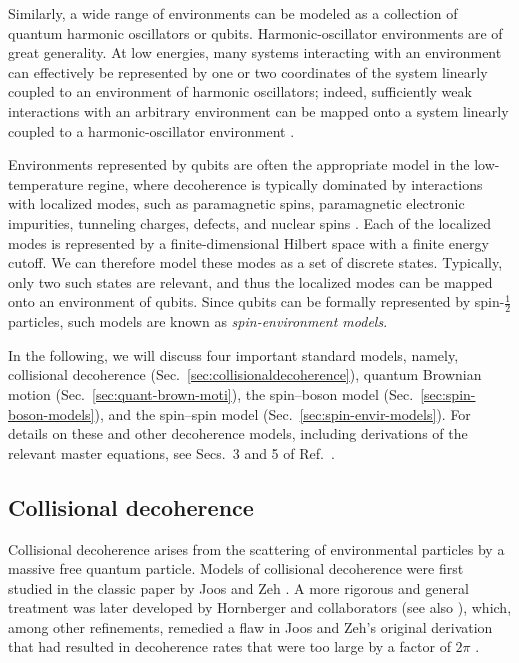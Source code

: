 \documentclass[aps,pra,reprint,amsmath,amssymb,showpacs,nofootinbib,floatfix,onecolumn,12pt]{revtex4-1}
\begin{document}
Similarly, a wide range of environments can be modeled as a collection of quantum harmonic oscillators or qubits. Harmonic-oscillator environments are of great generality. At low energies, many systems interacting with an environment can effectively be represented by one or two coordinates of the system linearly coupled to an environment of harmonic oscillators; indeed, sufficiently weak interactions with an arbitrary environment can be mapped onto a system linearly coupled to a harmonic-oscillator environment \cite{Feynman:1963:jj,Caldeira:1983:gv}.

Environments represented by qubits are often the appropriate model in the low-temperature regine, where decoherence is typically dominated by interactions with localized modes, such as paramagnetic spins, paramagnetic electronic impurities, tunneling charges, defects, and nuclear spins \cite{Dube:2001:zz,Prokofev:2000:zz,Lounasmaa:1974:yb}. Each of the localized modes is represented by a finite-dimensional Hilbert space with a finite energy cutoff. We can therefore model these modes as a set of discrete states. Typically, only two such states are relevant, and thus the localized modes can be mapped onto an environment of qubits. Since qubits can be formally represented by spin-$\frac{1}{2}$ particles, such models are known as \emph{spin-environment models}. 

In the following, we will discuss four important standard models, namely, collisional decoherence (Sec.~\ref{sec:collisionaldecoherence}), quantum Brownian motion (Sec.~\ref{sec:quant-brown-moti}), the spin--boson model (Sec.~\ref{sec:spin-boson-models}), and the spin--spin model (Sec.~\ref{sec:spin-envir-models}). For details on these and other decoherence models, including derivations of the relevant master equations, see Secs.~3 and 5 of Ref.~\cite{Schlosshauer:2007:un}. 

\subsection{\label{sec:collisionaldecoherence}Collisional decoherence}

Collisional decoherence arises from the scattering of environmental particles by a massive free quantum particle. Models of collisional decoherence were first studied in the classic paper by Joos and Zeh \cite{Joos:1985:iu}. A more rigorous and general treatment was later developed by Hornberger and collaborators \cite{Hornberger:2003:un,Hornberger:2006:tb,Hornberger:2008:ii,Busse:2009:aa,Busse:2010:aa} (see also \cite{Gallis:1990:un,Diosi:1995:um,Adler:2006:yb}), which, among other refinements, remedied a flaw in Joos and Zeh's original derivation that had resulted in decoherence rates that were too large by a factor of $2\pi$ \cite{Hornberger:2003:un}. 
\end{document}
